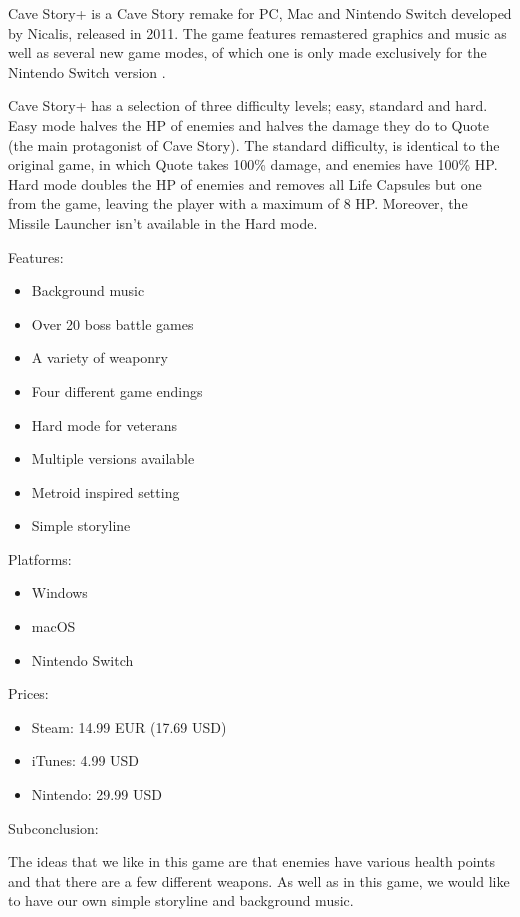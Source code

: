 \documentclass[12p]{article}
\begin{document}
Cave Story+ is a Cave Story remake for PC, Mac and Nintendo Switch developed by Nicalis, released in 2011. The game features remastered graphics and music as well as several new game modes, of which one is only made exclusively for the Nintendo Switch version \cite{CaveStoryPlusWiki}.

Cave Story+ has a selection of three difficulty levels; easy, standard and hard. Easy mode halves the HP of enemies and halves the damage they do to Quote (the main protagonist of Cave Story). The standard difficulty, is identical to the original game, in which Quote takes 100\% damage, and enemies have 100\% HP. Hard mode doubles the HP of enemies and removes all Life Capsules but one from the game, leaving the player with a maximum of 8 HP. Moreover, the Missile Launcher isn't available in the Hard mode.

Features:

\begin{itemize}
 \item Background music
 \item Over 20 boss battle games
 \item A variety of weaponry
 \item Four different game endings
 \item Hard mode for veterans
 \item Multiple versions available
 \item Metroid inspired setting
 \item Simple storyline
\end{itemize}

\newpage

Platforms:

\begin{itemize}
  \item Windows
  \item macOS
  \item Nintendo Switch
\end{itemize}

Prices:

\begin{itemize}
 \item Steam: 14.99 EUR (17.69 USD)
 \item iTunes: 4.99 USD
 \item Nintendo: 29.99 USD
\end{itemize}

Subconclusion:

The ideas that we like in this game are that enemies have various health points and that there are a few different weapons. As well as in this game, we would like to have our own simple storyline and background music.
\end{document}
